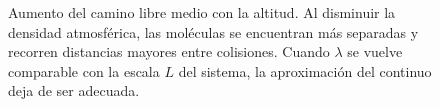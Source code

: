{\begin{figure}[htbp]
    \caption{Aumento del camino libre medio con la altitud. Al disminuir la
    densidad atmosférica, las moléculas se encuentran más separadas y recorren
    distancias mayores entre colisiones. Cuando $\lambda$ se vuelve comparable
    con la escala $L$ del sistema, la aproximación del continuo deja de ser
    adecuada.}
    \label{fig:camino-libre-medio-altitud}
\end{figure}%
}
